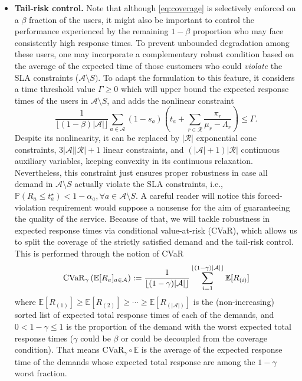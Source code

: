 \documentclass[letter,11pt, reqno]{amsart}
\def\E{\mathbb{E}}
\def\A{\mathcal{A}}
\def\RR{\mathcal{R}}
\begin{document}
\begin{itemize}
\item[-] \textbf{Tail-risk control.}
    Note that although \eqref{eq:coverage} is selectively enforced on a $\beta$ fraction of the users, it might also be important to control the performance experienced by the remaining $1-\beta$ proportion who may face consistently high response times.
To prevent unbounded degradation among these users, one may incorporate a complementary robust condition based on the average of the expected time of those customers who could \emph{violate} the {\rm SLA} constraints ($\A\setminus S)$. To adapt the formulation to this feature, it considers a time threshold value $\Gamma \geq 0$ which will upper bound the expected response times of the users in $\A\setminus S$, and adds the nonlinear constraint
$$
\frac{1}{\lfloor(1-\beta)|\A|\rfloor}\sum_{a\in\A}(1-s_a)\left(t_a+\sum_{r\in\RR}\frac{\pi_r}{\mu_r-\Lambda_r}\right)\leq \Gamma.
$$
Despite its nonlinearity, it can be replaced by $|\RR|$ exponential cone constraints, $3|\A||\RR|+1$ linear constraints, and $(|\A|+1)|\RR|$ continuous auxiliary variables, keeping convexity in its continuous relaxation. Nevertheless, this constraint just ensures proper robustness in case all demand in $\A\setminus S$ actually violate the {\rm SLA} constraints, i.e., $\mathbb{P}(R_a\le t^\star_a)<1-\alpha_a, \forall a\in\A\setminus S$. A careful reader will notice this forced-violation requirement would suppose a nonsense for the aim of guaranteeing the quality of the service. Because of that, we will tackle robustness in expected response times via conditional value-at-risk ({\rm CVaR}), which allows us to split the coverage of the strictly satisfied demand and the tail-risk control. This is performed through the notion of CVaR
$$
{\rm CVaR}_\gamma\left(\E[R_a]_{a\in\A}\right) : = \frac{1}{\lfloor (1-\gamma)|\A|\rfloor} \sum_{i=1}^{\lfloor (1-\gamma)|\A|\rfloor} \E[R_{(i)}]
$$
where $\E[R_{(1)}] \geq \E[R_{(2)}] \geq \cdots \geq \E[R_{(|\A|)}]$ is the (non-increasing) sorted list of expected total response times of each of the demands, and $0< 1-\gamma\leq 1$ is the proportion of the demand with the worst expected total response times ($\gamma$ could be $\beta$ or could be decoupled from the coverage condition). That means CVaR$_\gamma\circ \E$ is the average of the expected response time of the demands whose expected total response are among the $1-\gamma$ worst fraction.


\end{itemize}
\end{document}
